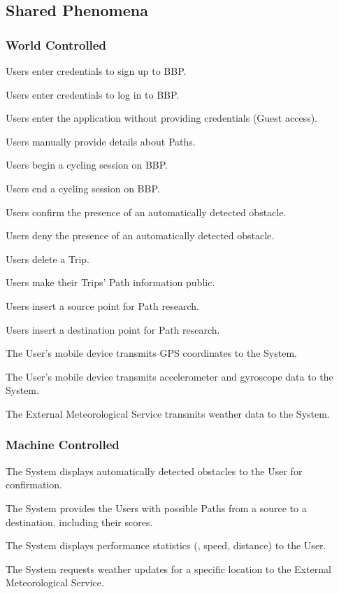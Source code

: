 \subsection{Shared Phenomena}

\subsubsection*{World Controlled}
\begin{splist}
    \item Users enter credentials to sign up to BBP.
    \item Users enter credentials to log in to BBP.
    \item Users enter the application without providing credentials (Guest access).
    \item Users manually provide details about Paths.
    \item Users begin a cycling session on BBP.
    \item Users end a cycling session on BBP.
    \item Users confirm the presence of an automatically detected obstacle.
    \item Users deny the presence of an automatically detected obstacle.
    \item Users delete a Trip.
    \item Users make their Trips' Path information public.
    \item Users insert a source point for Path research.
    \item Users insert a destination point for Path research.
    \item The User's mobile device transmits GPS coordinates to the System.
    \item The User's mobile device transmits accelerometer and gyroscope data to the System.
    \item The External Meteorological Service transmits weather data to the System.
\end{splist}

\subsubsection*{Machine Controlled}
\begin{splist}[resume]
    \item The System displays automatically detected obstacles to the User for confirmation.
    \item The System provides the Users with possible Paths from a source to a destination, including their scores.
    \item The System displays performance statistics (\eg, speed, distance) to the User.
    \item The System requests weather updates for a specific location to the External Meteorological Service.
\end{splist}

